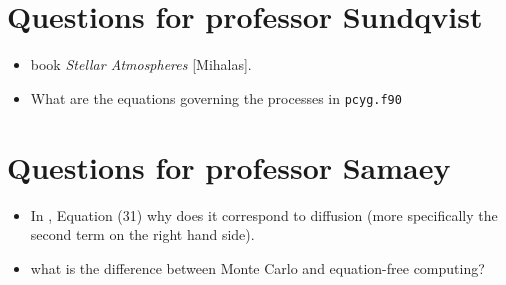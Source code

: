 \documentclass[../main/main.tex]{subfiles}
\begin{document}
\section{Questions for professor Sundqvist}
\begin{itemize}
\item book \textit{Stellar Atmospheres} [Mihalas].
\item What are the equations governing the processes in \texttt{pcyg.f90} 
\end{itemize}

\newpage
\section{Questions for professor Samaey}
\begin{itemize}
\item In \cite{Dimarco2018}, Equation (31) why does it correspond to diffusion (more specifically the second term on the right hand side).
\item what is the difference between Monte Carlo and equation-free computing?
\end{itemize}

\newpage
\end{document}
